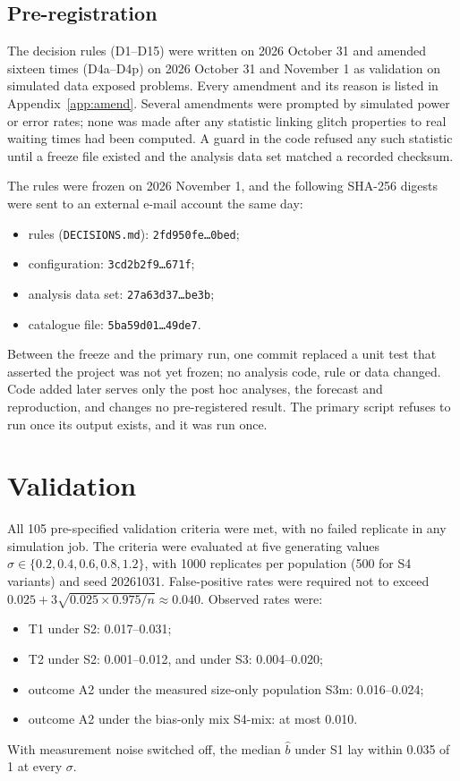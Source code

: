 \documentclass[fleqn,usenatbib]{mnras}
\newcommand{\bhat}{\hat b}
\begin{document}
\subsection{Pre-registration}\label{sec:prereg}
The decision rules (D1--D15) were written on 2026 October 31 and amended
sixteen times (D4a--D4p) on 2026 October 31 and November 1 as validation on
simulated data exposed problems. Every amendment and its reason is listed
in Appendix~\ref{app:amend}. Several amendments were prompted by simulated
power or error rates; none was made after any statistic linking glitch
properties to real waiting times had been computed. A guard in the code
refused any such statistic until a freeze file existed and the analysis
data set matched a recorded checksum.

The rules were frozen on 2026 November 1, and the following SHA-256
digests were sent to an external e-mail account the same day:
\begin{itemize}
\item rules (\texttt{DECISIONS.md}): \texttt{2fd950fe\ldots0bed};
\item configuration: \texttt{3cd2b2f9\ldots671f};
\item analysis data set: \texttt{27a63d37\ldots be3b};
\item catalogue file: \texttt{5ba59d01\ldots 49de7}.
\end{itemize}
Between the freeze and the primary run, one commit replaced a unit test
that asserted the project was not yet frozen; no analysis code, rule or
data changed. Code added later serves only the post hoc analyses, the
forecast and reproduction, and changes no pre-registered result. The primary
script refuses to run once its output exists, and it was run once.

\section{Validation}\label{sec:valid}
All 105 pre-specified validation criteria were met, with no failed
replicate in any simulation job. The criteria were evaluated at five
generating values $\sigma\in\{0.2,0.4,0.6,0.8,1.2\}$, with 1000 replicates
per population (500 for S4 variants) and seed 20261031. False-positive rates
were required not to exceed $0.025+3\sqrt{0.025\times0.975/n}\approx0.040$.
Observed rates were:
\begin{itemize}
\item T1 under S2: 0.017--0.031;
\item T2 under S2: 0.001--0.012, and under S3: 0.004--0.020;
\item outcome A2 under the measured size-only population S3m: 0.016--0.024;
\item outcome A2 under the bias-only mix S4-mix: at most 0.010.
\end{itemize}
With measurement noise switched off, the median $\bhat$ under S1 lay within
0.035 of 1 at every $\sigma$.
\end{document}
